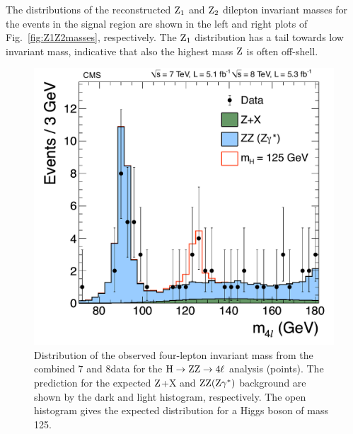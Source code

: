 \documentclass[11pt,twoside,a4paper,cmspaper,final,collab]{cms-tdr}
\begin{document}
The distributions of the reconstructed $\mathrm{Z}_1$ and $\mathrm{Z}_2$ dilepton invariant masses for the events in the
signal region are shown in the left and right plots of Fig.~\ref{fig:Z1Z2masses}, respectively.
The $\mathrm{Z}_1$ distribution has a tail towards low invariant mass,
indicative that also the highest mass $\mathrm{Z}$ is often off-shell.



\begin{figure}[htbp]
   \begin{center}
     \includegraphics[width=0.7\linewidth]{figures/HZZ_m4l_70_180_Higgs125_3GeV.pdf}
     \caption{
     Distribution of the observed four-lepton invariant mass from the combined 7 and 8\TeV data
for the $\mathrm{H} \to \mathrm{Z}\mathrm{Z}\to 4\ell$ analysis (points).
The prediction for the expected $\mathrm{Z}$+X and $\mathrm{Z}\mathrm{Z}(\mathrm{Z}\gamma^*)$ background are shown by the dark and
light histogram, respectively. The open histogram gives the expected distribution for a Higgs boson of mass 125\GeV.
     }
\label{fig:ZZmass}
   \end{center}
\end{figure}
\end{document}

